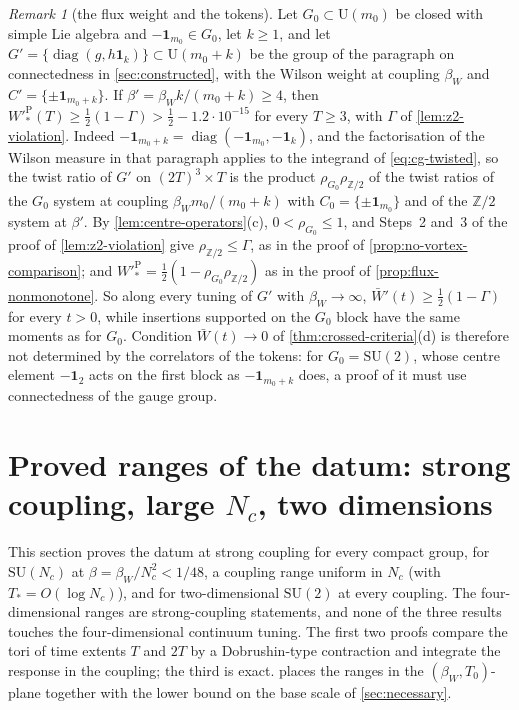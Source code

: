 \documentclass[11pt,a4paper]{amsart}
\theoremstyle{definition}
\theoremstyle{remark}
\newtheorem{remark}[theorem]{Remark}
\numberwithin{equation}{section}
\newcommand{\Z}{\mathbb{Z}}          %
\newcommand{\SU}{\mathrm{SU}}              %
\newcommand{\U}{\mathrm{U}}                %
\newcommand{\cube}[1]{(2#1)^3}             %
\newcommand{\Tzero}{T_0}                   %
\newcommand{\betaW}{\beta_{W}}             %
\begin{document}
\begin{remark}[the flux weight and the tokens]\label{rem:token-flux}
Let $G_0\subset\U(m_0)$ be closed with simple Lie algebra and $-\mathbf 1_{m_0}\in G_0$, let $k\ge1$, and let $G'=\{\operatorname{diag}(g,h\mathbf 1_k)\}\subset\U(m_0+k)$ be the group of the paragraph on connectedness in \cref{sec:constructed}, with the Wilson weight at coupling $\betaW$ and $C'=\{\pm\mathbf 1_{m_0+k}\}$. If $\beta'=\betaW k/(m_0+k)\ge4$, then $W'^{\mathrm P}_*(T)\ge\frac12(1-\Gamma)>\frac12-1.2\cdot10^{-15}$ for every $T\ge3$, with $\Gamma$ of \cref{lem:z2-violation}. Indeed $-\mathbf 1_{m_0+k}=\operatorname{diag}(-\mathbf 1_{m_0},-\mathbf 1_k)$, and the factorisation of the Wilson measure in that paragraph applies to the integrand of \eqref{eq:cg-twisted}, so the twist ratio of $G'$ on $\cube T\times T$ is the product $\rho_{G_0}\rho_{\Z/2}$ of the twist ratios of the $G_0$ system at coupling $\betaW m_0/(m_0+k)$ with $C_0=\{\pm\mathbf 1_{m_0}\}$ and of the $\Z/2$ system at $\beta'$. By \cref{lem:centre-operators}\textup{(c)}, $0<\rho_{G_0}\le1$, and Steps~2 and~3 of the proof of \cref{lem:z2-violation} give $\rho_{\Z/2}\le\Gamma$, as in the proof of \cref{prop:no-vortex-comparison}; and $W'^{\mathrm P}_*=\frac12(1-\rho_{G_0}\rho_{\Z/2})$ as in the proof of \cref{prop:flux-nonmonotone}. So along every tuning of $G'$ with $\betaW\to\infty$, $\bar W'(t)\ge\frac12(1-\Gamma)$ for every $t>0$, while insertions supported on the $G_0$ block have the same moments as for $G_0$. Condition $\bar W(t)\to0$ of \cref{thm:crossed-criteria}\textup{(d)} is therefore not determined by the correlators of the tokens: for $G_0=\SU(2)$, whose centre element $-\mathbf 1_2$ acts on the first block as $-\mathbf 1_{m_0+k}$ does, a proof of it must use connectedness of the gauge group.
\end{remark}
\section{Proved ranges of the datum: strong coupling, large $N_c$, two dimensions}\label{sec:ranges}

This section proves the datum at strong coupling for every compact group, for $\SU(N_c)$ at $\beta=\betaW/N_c^2<1/48$, a coupling range uniform in $N_c$ (with $T_*=O(\log N_c)$), and for two-dimensional $\SU(2)$ at every coupling. The four-dimensional ranges are strong-coupling statements, and none of the three results touches the four-dimensional continuum tuning. The first two proofs compare the tori of time extents $T$ and $2T$ by a Dobrushin-type contraction and integrate the response in the coupling; the third is exact.  places the ranges in the $(\betaW,\Tzero)$-plane together with the lower bound on the base scale of \cref{sec:necessary}.
\end{document}
